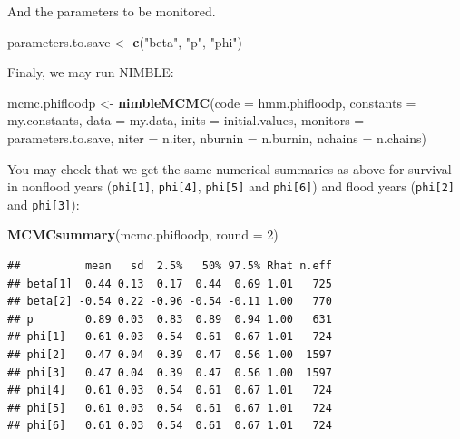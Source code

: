 \documentclass[
  12pt,
]{krantz}
\newenvironment{Shaded}{\begin{snugshade}}{\end{snugshade}}
\newcommand{\AttributeTok}[1]{\textcolor[rgb]{0.13,0.29,0.53}{#1}}
\newcommand{\DecValTok}[1]{\textcolor[rgb]{0.00,0.00,0.81}{#1}}
\newcommand{\FunctionTok}[1]{\textcolor[rgb]{0.13,0.29,0.53}{\textbf{#1}}}
\newcommand{\NormalTok}[1]{#1}
\newcommand{\OtherTok}[1]{\textcolor[rgb]{0.56,0.35,0.01}{#1}}
\newcommand{\StringTok}[1]{\textcolor[rgb]{0.31,0.60,0.02}{#1}}
\begin{document}
And the parameters to be monitored.

\begin{Shaded}
\begin{Highlighting}[]
\NormalTok{parameters.to.save }\OtherTok{\textless{}{-}} \FunctionTok{c}\NormalTok{(}\StringTok{"beta"}\NormalTok{, }\StringTok{"p"}\NormalTok{, }\StringTok{"phi"}\NormalTok{)}
\end{Highlighting}
\end{Shaded}

Finaly, we may run NIMBLE:

\begin{Shaded}
\begin{Highlighting}[]
\NormalTok{mcmc.phifloodp }\OtherTok{\textless{}{-}} \FunctionTok{nimbleMCMC}\NormalTok{(}\AttributeTok{code =}\NormalTok{ hmm.phifloodp, }
                             \AttributeTok{constants =}\NormalTok{ my.constants,}
                             \AttributeTok{data =}\NormalTok{ my.data,              }
                             \AttributeTok{inits =}\NormalTok{ initial.values,}
                             \AttributeTok{monitors =}\NormalTok{ parameters.to.save,}
                             \AttributeTok{niter =}\NormalTok{ n.iter,}
                             \AttributeTok{nburnin =}\NormalTok{ n.burnin, }
                             \AttributeTok{nchains =}\NormalTok{ n.chains)}
\end{Highlighting}
\end{Shaded}

You may check that we get the same numerical summaries as above for survival in nonflood years (\texttt{phi{[}1{]}}, \texttt{phi{[}4{]}}, \texttt{phi{[}5{]}} and \texttt{phi{[}6{]}}) and flood years (\texttt{phi{[}2{]}} and \texttt{phi{[}3{]}}):

\begin{Shaded}
\begin{Highlighting}[]
\FunctionTok{MCMCsummary}\NormalTok{(mcmc.phifloodp, }\AttributeTok{round =} \DecValTok{2}\NormalTok{)}
\end{Highlighting}
\end{Shaded}

\begin{verbatim}
##          mean   sd  2.5%   50% 97.5% Rhat n.eff
## beta[1]  0.44 0.13  0.17  0.44  0.69 1.01   725
## beta[2] -0.54 0.22 -0.96 -0.54 -0.11 1.00   770
## p        0.89 0.03  0.83  0.89  0.94 1.00   631
## phi[1]   0.61 0.03  0.54  0.61  0.67 1.01   724
## phi[2]   0.47 0.04  0.39  0.47  0.56 1.00  1597
## phi[3]   0.47 0.04  0.39  0.47  0.56 1.00  1597
## phi[4]   0.61 0.03  0.54  0.61  0.67 1.01   724
## phi[5]   0.61 0.03  0.54  0.61  0.67 1.01   724
## phi[6]   0.61 0.03  0.54  0.61  0.67 1.01   724
\end{verbatim}
\end{document}
